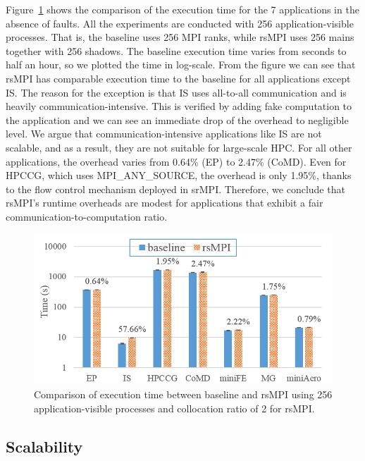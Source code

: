 Figure~\ref{fig:runtime_overhead} shows the comparison of the execution time for the 7 applications in the absence of faults. All the experiments are conducted with 256 application-visible processes. That is, the baseline uses 256 MPI ranks, while rsMPI uses 256 mains together with 256 shadows. The baseline execution time varies from seconds to half an hour, so we plotted the time in log-scale. 
From the figure we can see that rsMPI has comparable execution time to the baseline for all applications except IS. The reason for the exception is that IS uses all-to-all communication and is heavily communication-intensive. This is verified by adding fake computation to the application and we can see an immediate drop of the overhead to negligible level. 
We argue that communication-intensive applications like IS are not scalable, and as a result, they are not suitable for large-scale HPC. 
For all other applications, the overhead varies from 0.64\% (EP) to 2.47\% (CoMD). Even for HPCCG, which uses MPI\_ANY\_SOURCE, the overhead is only 1.95\%, thanks to the flow control mechanism deployed in srMPI. 
Therefore, we conclude that rsMPI's runtime overheads are modest for applications that exhibit a fair communication-to-computation ratio.

\begin{figure}[!t]
  \begin{center}
      \includegraphics[width=0.6\columnwidth]{Figures/runtime_overhead_hpcc}
  \end{center}
  \caption{Comparison of execution time between baseline and rsMPI using 256 application-visible processes and collocation ratio of 2 for rsMPI.}
  \label{fig:runtime_overhead}
\end{figure}

\subsection{Scalability}

